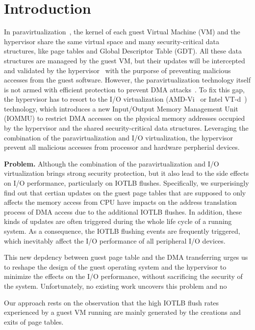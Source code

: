 \section{Introduction} \label{sec:intro}
In paravirtualization~\cite{XEN-SOSP03,denali-paravirtualization}, the kernel of each guest Virtual Machine (VM) and the hypervisor share the same virtual space and many security-critical data structures, like page tables and Global Descriptor Table (GDT). All these data structures are manageed by the guest VM, but their updates will be intercepted and validated by the hypervisor~\cite{XEN-SOSP03} with the purporse of preventing malicious accesses from the guest software.
However, the paravirtualization technology itself is not armed with efficient protection to prevent DMA attacks~\cite{disaggregation}.
To fix this gap, the hypervisor has to resort to the I/O virtualization (AMD-Vi~\cite{amdvt} or Intel VT-d~\cite{intelvt}) technology, which introduces a new Input/Output Memory Management Unit (IOMMU) to restrict DMA accesses on the physical memory addresses occupied by the hypervisor and the shared security-critical data structures. 
Leveraging the combination of the paravirtualization and I/O virtualization, the hypervisor prevent all malicious accesses from processor and hardware perpherial devices.

\textbf{Problem.} Although the combination of the paravirtualization and I/O virtualization brings strong security protection, but it also lead to the side effects on I/O performance, particularly on IOTLB flushes. 
Specifically, we surperisingly find out that certian updates on the guest page tables that are supposed to only affects the memory access from CPU have impacts on  the address translation process of DMA access due to the additional IOTLB flushes. 
In addition, these kinds of updates are often triggered during the whole life cycle of a running system.
As a consequence, the IOTLB flushing events are frequently triggered, which inevitably affect the I/O performance of all peripheral I/O devices.


This new depdency between guest page table and the DMA transferring urges us to reshape the design of the guest operating system and the hypervisor to minimize the effects on the I/O performance, without sacrificing the security of the system. 
Unfortunately, no existing work uncovers this problem and no

Our approach rests on the observation that the high IOTLB flush rates experienced by a guest VM running 
are mainly generated by the creations and exits of page tables. 

